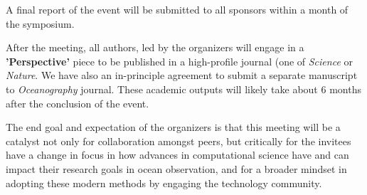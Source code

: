 A final report of the event will be submitted to all sponsors within a
month of the symposium.

After the meeting, all authors, led by the organizers will engage in a
\textbf{'Perspective'} piece to be published in a high-profile journal
(one of \emph{Science} or \emph{Nature}. We have also an in-principle
agreement to submit a separate manuscript to \emph{Oceanography}
journal. These academic outputs will likely take about 6 months after
the conclusion of the event.

The end goal and expectation of the organizers is that this meeting
will be a catalyst not only for collaboration amongst peers, but
critically for the invitees have a change in focus in how advances in
computational science have and can impact their research goals in
ocean observation, and for a broader mindset in adopting these modern
methods by engaging the technology community.